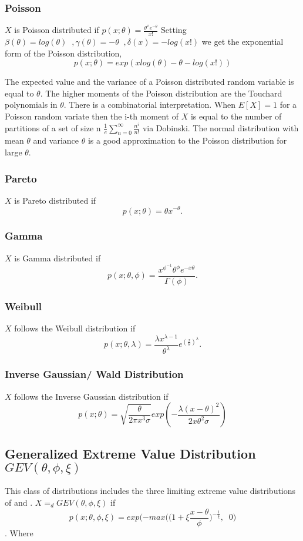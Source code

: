 \subsubsection{Poisson}
$X$ is Poisson distributed if $p(x;\theta)=\frac{\theta^x
e^{-\theta}}{x!}$  Setting $\beta(\theta)=log(\theta) \;\;,
\gamma(\theta)=-\theta \;\;, \delta(x)=-log(x!)$ we get the
exponential form of the Poisson distribution,
\[p(x;\theta)= exp(x log(\theta) - \theta- log(x!))\]

The expected value and the variance of a Poisson distributed random variable is equal to $\theta$. The higher moments of the Poisson distribution are the Touchard polynomials in $\theta$.  There is a combinatorial interpretation.  When $E[X]=1$ for a Poisson random variate then the i-th moment of $X$ is equal to the number of partitions of a set of size n $\frac{1}{e} \sum\limits_{n=0}^{\infty} \frac{n^i}{n!}$ via Dobinski.  The normal distribution with mean $\theta$ and variance $\theta$ is a good approximation to the Poisson distribution for large $\theta$.


\subsubsection{Pareto}
$X$ is Pareto distributed if \[p(x;\theta)=\theta
x^{-\theta}.\]

\subsubsection{Gamma}
$X$ is Gamma distributed if \[p(x;\theta,
\phi)=\frac{x^{\phi^{-1}}\theta^\phi e^{-x \theta}} {
\Gamma(\phi)}.\]

\subsubsection{Weibull}
$X$ follows the Weibull distribution if \[p(x; \theta , \lambda
) = \frac{\lambda x^{\lambda-1}}{\theta^\lambda}
e^{(\frac{x}{\theta} )^\lambda}.\]

\subsubsection{Inverse Gaussian/ Wald Distribution}
$X$ follows the Inverse Gaussian distribution if
\[p(x;\theta)= \sqrt{\frac{\theta}{2 \pi x^3 \sigma}}exp(-
\frac{\lambda(x-\theta)^2}{2 x \theta^2 \sigma}) \]

\subsection{Generalized Extreme Value Distribution $GEV(\theta,\phi,\xi)$}
This class of distributions includes the three limiting extreme
value distributions of \cite{Fisher Tippet (1928)} and
\cite{Gnedenko (1943)}.  $X =_d GEV(\theta,\phi,\xi)$ if
\[p(x;\theta,\phi,\xi)= exp( -  max\biggl(\bigl(1 + \xi
\frac{x-\theta}{\phi} \bigr)^{- \frac{1}{\xi} }, \;\; 0 \biggr)
\]. Where


